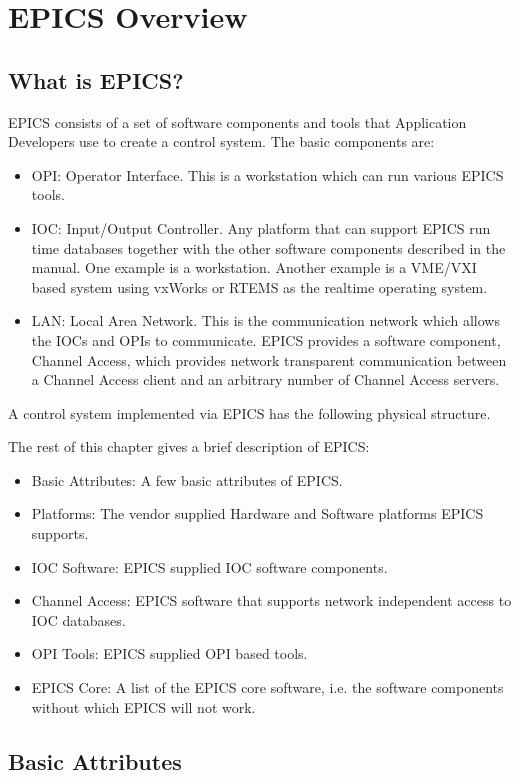 





\chapter{EPICS Overview}

\section{What is EPICS?}

EPICS consists of a set of software components and tools that Application Developers use to create a control system. The 
basic components are:

\begin{itemize}\item OPI: Operator Interface. This is a workstation which can run various EPICS tools.

\item IOC: Input/Output Controller. Any platform that can support EPICS run time databases together with the other 
software components described in the manual. One example is a workstation. Another example is a VME/VXI 
based system using vxWorks or RTEMS as the realtime operating system.

\item LAN: Local Area Network. This is the communication network which allows the IOCs and OPIs to communicate. 
EPICS provides a software component, Channel Access, which provides network transparent communication 
between a Channel Access client and an arbitrary number of Channel Access servers.

\end{itemize}A control system implemented via EPICS has the following physical structure.

The rest of this chapter gives a brief description of EPICS:

\begin{itemize}\item Basic Attributes: A few basic attributes of EPICS.

\item Platforms: The vendor supplied Hardware and Software platforms EPICS supports.

\item IOC Software: EPICS supplied IOC software components.

\item Channel Access:  EPICS software that supports network independent access to IOC databases.

\item OPI Tools: EPICS supplied OPI based tools.

\item EPICS Core: A list of the EPICS core software, i.e. the software components without which EPICS will not work.

\end{itemize}\section{Basic Attributes}

